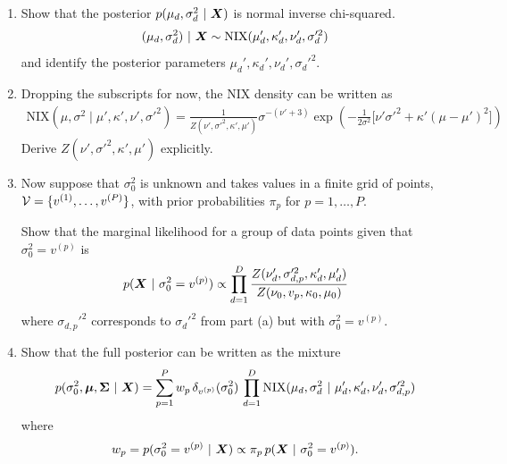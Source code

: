 \documentclass[11pt]{article}
\begin{document}
\begin{enumerate}[label=(\alph*)]
    \item Show that the posterior $p(\mu_{d},\sigma_{d}^2 ~\vert~ \boldsymbol{X})$ is normal inverse chi-squared.
    \begin{align*}
    (\mu_{d},\sigma_{d}^2) ~\vert~ \boldsymbol{X} \sim \mathrm{NIX}(\mu_{d}', \kappa_{d}', \nu_{d}', \sigma_{d}'^2)
    \end{align*}
    and identify the posterior parameters $\mu_{d}',\kappa_{d}',\nu_{d}', \sigma_{d}'^2$.

    \item Dropping the subscripts for now, the NIX density can be written as
    \begin{align*}
    \mathrm{NIX}(\mu,\sigma^2 \mid \mu',\kappa',\nu', \sigma'^2)
    =
    \frac{1}{Z(\nu',\sigma'^2,\kappa',\mu')}
    \sigma^{-(\nu'+3)}
    \exp\!\left(
    -\frac{1}{2\sigma^2}\Big[\nu' \sigma'^2+\kappa'(\mu-\mu')^2\Big]
    \right)
    \end{align*}
    Derive $Z(\nu',\sigma'^2,\kappa',\mu')$ explicitly. 
    
    \item Now suppose that $\sigma_0^2$ is unknown and takes values in a finite grid of points,
    $\mathcal{V} = \{v^{(1)},\dots,v^{(P)}\}$,
    with prior probabilities $\pi_p$ for $p=1,\dots,P$.

    Show that the marginal likelihood for a group of data points given that $\sigma_0^2 = v^{(p)}$ is
    \begin{align*}
    p(\boldsymbol{X} ~\vert~ \sigma_0^2=v^{(p)})
    \propto
    \prod_{d=1}^D \frac{Z(\nu_{d}', \sigma_{d,p}'^2, \kappa_{d}',\mu_{d}')}
         {Z(\nu_0, v_p, \kappa_0, \mu_0)}
    \end{align*}
    where $\sigma_{d,p}'^2$ corresponds to $\sigma_{d}'^2$ from part (a) but with $\sigma_0^2=v^{(p)}$.
    
    \item Show that the full posterior can be written as the mixture
    \begin{align*}
        p(\sigma_0^2,\boldsymbol{\mu},\boldsymbol{\Sigma} ~\vert~ \boldsymbol{X})
        =
        \sum_{p=1}^P w_{p}\,
        \delta_{v^{(p)}}(\sigma_0^2)\, \prod_{d=1}^D
        \mathrm{NIX}(\mu_{d},\sigma_{d}^2 ~\vert~ \mu_{d}',\kappa_{d}',\nu_{d}', \sigma_{d,p}'^2)
    \end{align*}
    where
    \begin{align*}
        w_{p} = p(\sigma_0^2=v^{(p)} ~\vert~ \boldsymbol{X}) \propto
        \pi_p \, p(\boldsymbol{X} ~\vert~ \sigma_0^2=v^{(p)}).
    \end{align*}
\end{enumerate}
\end{document}
